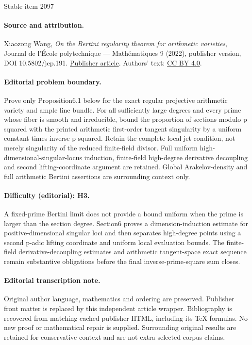 \documentclass[11pt]{article}
\numberwithin{equation}{section}
\theoremstyle{plain}
\theoremstyle{definition}
\begin{document}
\begin{center}{\Large Stable item 2097}\end{center}
\paragraph{Source and attribution.}
Xiaozong Wang, \emph{On the Bertini regularity theorem for arithmetic varieties}, Journal de l’École polytechnique — Mathématiques 9 (2022), publisher version, DOI 10.5802/jep.191. \href{https://jep.centre-mersenne.org/articles/10.5802/jep.191/}{Publisher article}. Authors' text: \href{https://creativecommons.org/licenses/by/4.0/}{CC BY 4.0}.
\paragraph{Editorial problem boundary.}
Prove only Proposition6.1 below for the exact regular projective arithmetic variety and ample line bundle. For all sufficiently large degrees and every prime whose fiber is smooth and irreducible, bound the proportion of sections modulo p squared with the printed arithmetic first-order tangent singularity by a uniform constant times inverse p squared. Retain the complete local-jet condition, not merely singularity of the reduced finite-field divisor. Full uniform high-dimensional-singular-locus induction, finite-field high-degree derivative decoupling and second lifting-coordinate argument are retained. Global Arakelov-density and full arithmetic Bertini assertions are surrounding context only.
\paragraph{Difficulty (editorial): H3.}
A fixed-prime Bertini limit does not provide a bound uniform when the prime is larger than the section degree. Section6 proves a dimension-induction estimate for positive-dimensional singular loci and then separates high-degree points using a second p-adic lifting coordinate and uniform local evaluation bounds. The finite-field derivative-decoupling estimates and arithmetic tangent-space exact sequence remain substantive obligations before the final inverse-prime-square sum closes.
\paragraph{Editorial transcription note.}
Original author language, mathematics and ordering are preserved. Publisher front matter is replaced by this independent article wrapper. Bibliography is recovered from matching cached publisher HTML, including its TeX formulas. No new proof or mathematical repair is supplied. Surrounding original results are retained for conservative context and are not extra selected corpus claims.
\clearpage
\end{document}
